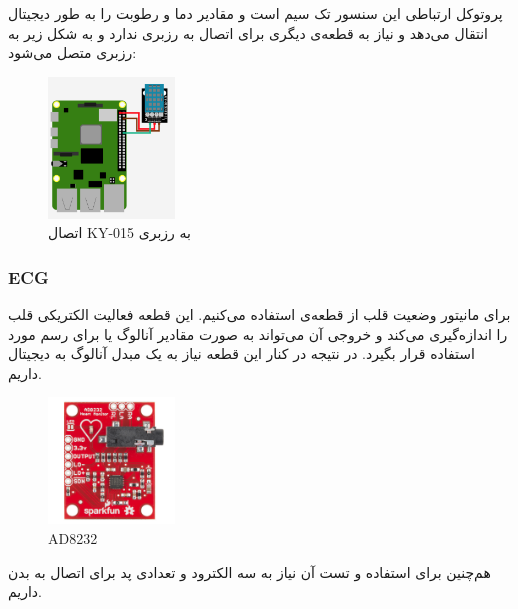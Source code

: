 \documentclass[12pt]{article}
\begin{document}
پروتوکل ارتباطی این سنسور تک سیم است و مقادیر دما و رطوبت را به طور دیجیتال انتقال می‌دهد و نیاز به قطعه‌‌ی دیگری برای 
اتصال به رزبری ندارد و به شکل زیر به رزبری متصل می‌شود:


\begin{figure}[h]
	\begin{center}
		\includegraphics[width=0.3\textwidth]{KY-015-raspberry}
	\end{center}
	\caption{اتصال KY-015 به رزبری}
\end{figure}


\subsubsection{ECG}

برای مانیتور وضعیت قلب از قطعه‌ی  استفاده می‌کنیم. این قطعه فعالیت الکتریکی قلب را اندازه‌گیری می‌کند و خروجی آن می‌تواند به صورت مقادیر آنالوگ یا برای رسم  مورد استفاده قرار بگیرد. در نتیجه در کنار این قطعه نیاز به یک مبدل آنالوگ به دیجیتال داریم. 


\begin{figure}[h]
	\begin{center}
		\includegraphics[width=0.3\textwidth]{AD8232}
	\end{center}
	\caption{AD8232}
\end{figure}

هم‌چنین برای استفاده و تست آن نیاز به سه الکترود و تعدادی پد برای اتصال به بدن داریم.





\newpage
\end{document}
